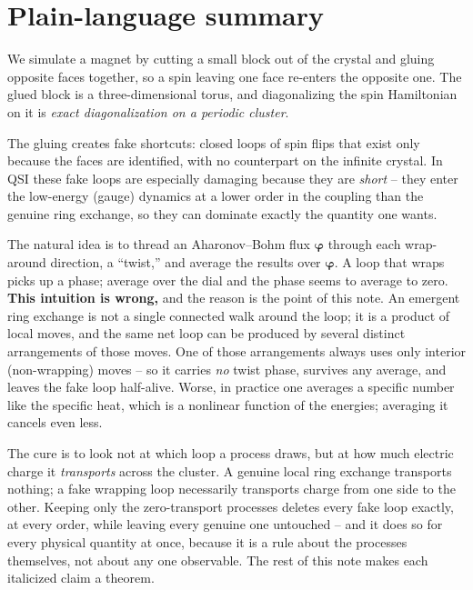 \documentclass[11pt,letterpaper]{article}
\newcommand{\bvarphi}{\bm{\varphi}}
\theoremstyle{plain}
\theoremstyle{definition}
\begin{document}
\tableofcontents

\section{Plain-language summary}
\label{sec:nomath}

We simulate a magnet by cutting a small block out of the crystal and
gluing opposite faces together, so a spin leaving one face re-enters the
opposite one. The glued block is a three-dimensional torus, and
diagonalizing the spin Hamiltonian on it is \emph{exact diagonalization
on a periodic cluster}.

The gluing creates fake shortcuts: closed loops of spin flips that exist
only because the faces are identified, with no counterpart on the
infinite crystal. In QSI these fake loops are especially damaging
because they are \emph{short} -- they enter the low-energy (gauge)
dynamics at a lower order in the coupling than the genuine ring
exchange, so they can dominate exactly the quantity one wants.

The natural idea is to thread an Aharonov--Bohm flux $\bvarphi$ through
each wrap-around direction, a ``twist,'' and average the results over
$\bvarphi$. A loop that wraps picks up a phase; average over the dial
and the phase seems to average to zero. \textbf{This intuition is
wrong,} and the reason is the point of this note. An emergent ring
exchange is not a single connected walk around the loop; it is a product
of local moves, and the same net loop can be produced by several
distinct arrangements of those moves. One of those arrangements always
uses only interior (non-wrapping) moves -- so it carries \emph{no} twist
phase, survives any average, and leaves the fake loop half-alive. Worse,
in practice one averages a specific number like the specific heat, which
is a nonlinear function of the energies; averaging it cancels even less.

The cure is to look not at which loop a process draws, but at how much
electric charge it \emph{transports} across the cluster. A genuine local
ring exchange transports nothing; a fake wrapping loop necessarily
transports charge from one side to the other. Keeping only the
zero-transport processes deletes every fake loop exactly, at every order,
while leaving every genuine one untouched -- and it does so for every
physical quantity at once, because it is a rule about the processes
themselves, not about any one observable. The rest of this note makes
each italicized claim a theorem.
\end{document}
